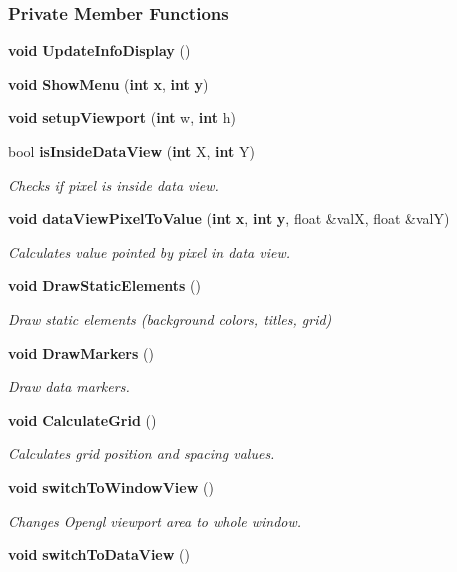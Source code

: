 \subsubsection*{Private Member Functions}
\begin{DoxyCompactItemize}
\item 
{\bf void} {\bf Update\+Info\+Display} ()
\item 
{\bf void} {\bf Show\+Menu} ({\bf int} {\bf x}, {\bf int} {\bf y})
\item 
{\bf void} {\bf setup\+Viewport} ({\bf int} w, {\bf int} h)
\item 
bool {\bf is\+Inside\+Data\+View} ({\bf int} X, {\bf int} Y)
\begin{DoxyCompactList}\small\item\em Checks if pixel is inside data view. \end{DoxyCompactList}\item 
{\bf void} {\bf data\+View\+Pixel\+To\+Value} ({\bf int} {\bf x}, {\bf int} {\bf y}, float \&valX, float \&valY)
\begin{DoxyCompactList}\small\item\em Calculates value pointed by pixel in data view. \end{DoxyCompactList}\item 
{\bf void} {\bf Draw\+Static\+Elements} ()
\begin{DoxyCompactList}\small\item\em Draw static elements (background colors, titles, grid) \end{DoxyCompactList}\item 
{\bf void} {\bf Draw\+Markers} ()
\begin{DoxyCompactList}\small\item\em Draw data markers. \end{DoxyCompactList}\item 
{\bf void} {\bf Calculate\+Grid} ()
\begin{DoxyCompactList}\small\item\em Calculates grid position and spacing values. \end{DoxyCompactList}\item 
{\bf void} {\bf switch\+To\+Window\+View} ()
\begin{DoxyCompactList}\small\item\em Changes Opengl viewport area to whole window. \end{DoxyCompactList}\item 
{\bf void} {\bf switch\+To\+Data\+View} ()

\end{DoxyCompactItemize}
